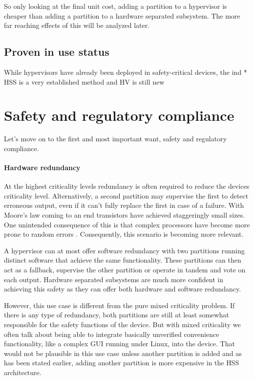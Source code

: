 So only looking at the final unit cost, adding a partition to a hypervisor is cheaper than adding a partition to a hardware separated subsystem. The more far reaching effects of this will be analyzed later.

\subsection{Proven in use status}
While hypervisors have already been deployed in safety-critical devices, the ind
* HSS is a very established method and HV is still new

\section{Safety and regulatory compliance \label{safety-analysis}}
 Let's move on to the first and most important want, safety and regulatory compliance. 
 \paragraph{Hardware redundancy}
 At the highest criticality levels redundancy is often required to reduce the devices criticality level. Alternatively, a second partition may supervise the first to detect erroneous output, even if it can't fully replace the first in case of a failure. With Moore's law coming to an end transistors have achieved staggeringly small sizes. One unintended consequence of this is that complex processors have become more prone to random errors \cite{Constantinescu.2003}. Consequently, this scenario is becoming more relevant.
 
 A hypervisor can at most offer software redundancy with two partitions running distinct software that achieve the same functionality. These partitions can then act as a fallback, supervise the other partition or operate in tandem and vote on each output. Hardware separated subsystems are much more confident in achieving this safety as they can offer both hardware and software redundancy. 
 
However, this use case is different from the pure mixed criticality problem. If there is any type of redundancy, both partitions are still at least somewhat responsible for the safety functions of the device. But with mixed criticality we often talk about being able to integrate basically unverified convenience functionality, like a complex GUI running under Linux, into the device. That would not be plausible in this use case unless another partition is added and as has been stated earlier, adding another partition is more expensive in the \gls{HSS} architecture.

